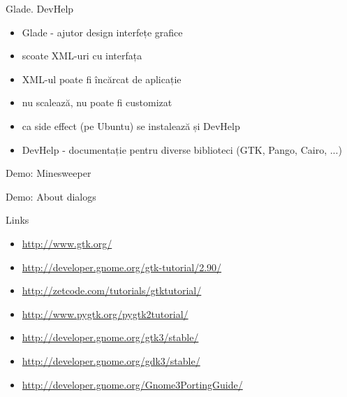 \documentclass{beamer}
\begin{document}
\begin{frame}{Glade. DevHelp}
  \begin{itemize}
    \item Glade - ajutor design interfețe grafice
    \item scoate XML-uri cu interfața
    \item XML-ul poate fi încărcat de aplicație
    \item nu scalează, nu poate fi customizat
  \pause
    \item ca side effect (pe Ubuntu) se instalează și DevHelp
    \item DevHelp - documentație pentru diverse biblioteci (GTK, Pango, Cairo, ...)
  \end{itemize}
\end{frame}

\begin{frame}{Demo: Minesweeper}
  \begin{center}
  \end{center}
\end{frame}

\begin{frame}{Demo: About dialogs}
  \begin{center}
  \end{center}
\end{frame}

\begin{frame}{Links}
  \begin{itemize}
    \item \url{http://www.gtk.org/}
    \item \url{http://developer.gnome.org/gtk-tutorial/2.90/}
    \item \url{http://zetcode.com/tutorials/gtktutorial/}
    \item \url{http://www.pygtk.org/pygtk2tutorial/}
    \item \url{http://developer.gnome.org/gtk3/stable/}
    \item \url{http://developer.gnome.org/gdk3/stable/}
    \item \url{http://developer.gnome.org/Gnome3PortingGuide/}
  \end{itemize}
\end{frame}
\end{document}

